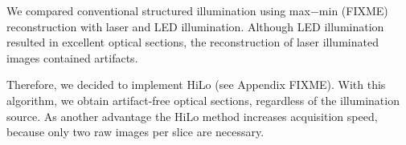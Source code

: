 We compared conventional structured illumination using max$-$min
(FIXME) reconstruction with laser and LED illumination. Although LED
illumination resulted in excellent optical sections, the
reconstruction of laser illuminated images contained artifacts.


Therefore, we decided to implement HiLo (see Appendix FIXME). With
this algorithm, we obtain artifact-free optical sections, regardless
of the illumination source. As another advantage the HiLo method
increases acquisition speed, because only two raw images per slice are
necessary.



     







